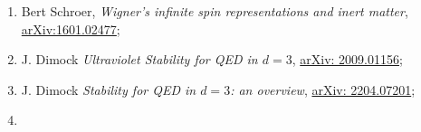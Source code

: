 \documentclass[a4paper,11pt]{article}
\begin{document}
\begin{enumerate}
\item Bert Schroer, \textit{Wigner's infinite spin representations and
    inert matter},
  \href{https://arxiv.org/abs/1601.02477}{arXiv:1601.02477};

\item J. Dimock \textit{Ultraviolet Stability for QED in $d = 3$},
  \href{https://arxiv.org/abs/2009.01156}{arXiv: 2009.01156};

\item J. Dimock \textit{Stability for QED in $d = 3$: an overview},
  \href{https://arxiv.org/abs/2204.07201}{arXiv: 2204.07201};

\item



























































































\end{enumerate}
\end{document}
